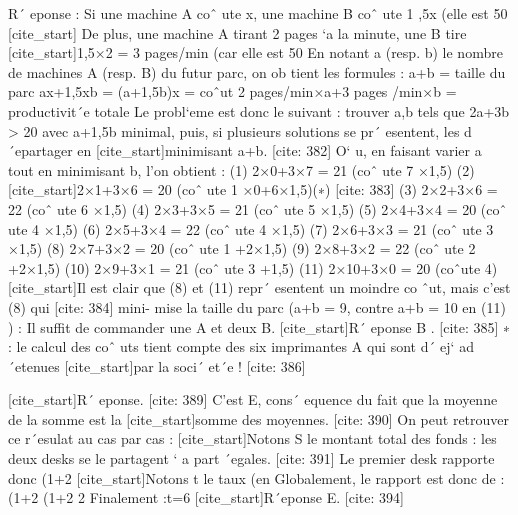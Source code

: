 R´ eponse : Si une machine A coˆ ute x, une machine B coˆ ute 1 ,5x (elle est 50
 [cite_start]%
De plus, une machine A tirant 2 pages `a la minute, une B tire 
 [cite_start]1,5×2 = 3 pages/min (car elle est 50 %
En notant a (resp. b) le nombre de machines A (resp. B) du futur parc, on ob 
 tient les formules :
 a+b = taille du parc
 ax+1,5xb = (a+1,5b)x = coˆut
 2 pages/min×a+3 pages /min×b = productivit´e totale 
 Le probl`eme est donc le suivant : trouver a,b tels que 
 2a+3b > 20
 avec a+1,5b minimal, puis, si plusieurs solutions se pr´ esentent, les d ´epartager en 
 [cite_start]minimisant a+b. [cite: 382]
O` u, en faisant varier a tout en minimisant b, l’on obtient :
 (1) 2×0+3×7 = 21 (coˆ ute 7 ×1,5)
 (2) [cite_start]2×1+3×6 = 20 (coˆ ute 1 ×0+6×1,5)(∗) [cite: 383]
(3) 2×2+3×6 = 22 (coˆ ute 6 ×1,5)
 (4) 2×3+3×5 = 21 (coˆ ute 5 ×1,5)
 (5) 2×4+3×4 = 20 (coˆ ute 4 ×1,5)
 (6) 2×5+3×4 = 22 (coˆ ute 4 ×1,5)
 (7) 2×6+3×3 = 21 (coˆ ute 3 ×1,5)
 (8) 2×7+3×2 = 20 (coˆ ute 1 +2×1,5)
 (9) 2×8+3×2 = 22 (coˆ ute 2 +2×1,5)
 (10) 2×9+3×1 = 21 (coˆ ute 3 +1,5)
 (11) 2×10+3×0 = 20 (coˆute 4) 
 [cite_start]Il est clair que (8) et (11) repr´ esentent un moindre co ˆut, mais c’est (8) qui [cite: 384]
mini- 
 mise la taille du parc (a+b = 9, contre a+b = 10 en (11) ) : Il suffit de commander
 une A et deux B.
 [cite_start]R´ eponse B . [cite: 385]
∗ : le calcul des coˆ uts tient compte des six imprimantes A qui sont d´ ej` ad´etenues 
 [cite_start]par la soci´ et´e ! [cite: 386]

[cite_start]R´ eponse. [cite: 389]
C’est E, cons´ equence du fait que la moyenne de la somme est la
 [cite_start]somme des moyennes. [cite: 390]
On peut retrouver ce r´esulat au cas par cas : 
 [cite_start]Notons S le montant total des fonds : les deux desks se le partagent ` a part ´egales. [cite: 391]
Le premier desk rapporte donc (1+2%
 [cite_start]Notons t le taux (en %
Globalement, le rapport est donc de :
 (1+2%
 (1+2%
2%
 Finalement :t=6
 [cite_start]R´eponse E. [cite: 394]

